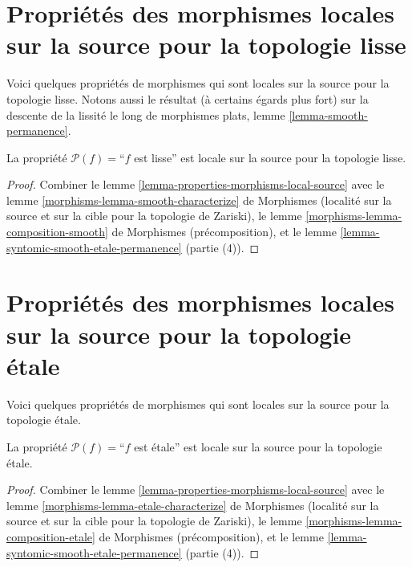 \section{Propriétés des morphismes locales sur la source pour la topologie lisse}
\label{section-smooth-local-source}

\noindent
Voici quelques propriétés de morphismes qui sont locales sur la source pour la
topologie lisse. Notons aussi le résultat (à certains égards plus fort)
sur la descente de la lissité le long de morphismes plats,
lemme \ref{lemma-smooth-permanence}.

\begin{lemma}
\label{lemma-smooth-smooth-local-source}
La propriété $\mathcal{P}(f)=$``$f$ est lisse''
est locale sur la source pour la topologie lisse.
\end{lemma}

\begin{proof}
Combiner le lemme \ref{lemma-properties-morphisms-local-source} avec le
lemme \ref{morphisms-lemma-smooth-characterize} de Morphismes
(localité sur la source et sur la cible pour la topologie de Zariski), le
lemme \ref{morphisms-lemma-composition-smooth} de Morphismes
(précomposition), et le
lemme \ref{lemma-syntomic-smooth-etale-permanence} (partie (4)).
\end{proof}



\section[Localité sur la source (\'etale)]{Propriétés des morphismes locales sur la source pour la topologie \'etale}
\label{section-etale-local-source}

\noindent
Voici quelques propriétés de morphismes qui sont locales sur la source pour la
topologie \'etale.

\begin{lemma}
\label{lemma-etale-etale-local-source}
La propriété $\mathcal{P}(f)=$``$f$ est \'etale''
est locale sur la source pour la topologie \'etale.
\end{lemma}

\begin{proof}
Combiner le lemme \ref{lemma-properties-morphisms-local-source} avec le
lemme \ref{morphisms-lemma-etale-characterize} de Morphismes
(localité sur la source et sur la cible pour la topologie de Zariski), le
lemme \ref{morphisms-lemma-composition-etale} de Morphismes
(précomposition), et le
lemme \ref{lemma-syntomic-smooth-etale-permanence} (partie (4)).
\end{proof}

